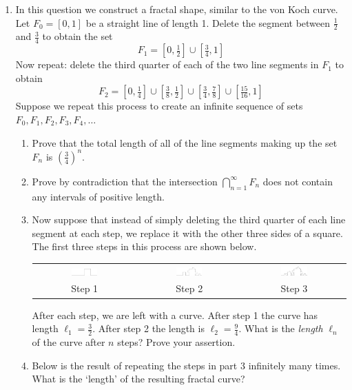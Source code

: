 \begin{exercises}{}{}
\begin{enumerate}
	\item In this question we construct a fractal shape, similar to the von Koch curve. Let $F_0=[0,1]$ be a straight line of length 1. Delete the segment between $\frac 12$ and $\frac 34$ to obtain the set
    \[F_1=[0,\tfrac 12]\cup[\tfrac 34,1]\]
    Now repeat: delete the third quarter of each of the two line segments in $F_1$ to obtain
    \[F_2=[0,\tfrac 14]\cup[\tfrac 38,\tfrac 12]\cup[\tfrac 34,\tfrac 78]\cup[\tfrac{15}{16},1]\]
    Suppose we repeat this process to create an infinite sequence of sets $F_0,F_1,F_2,F_3,F_4,\ldots$
  \begin{enumerate}
    \item Prove that the total length of all of the line segments making up the set $F_n$ is $\left(\frac 34\right)^n$.
    \item Prove by contradiction that the intersection $\bigcap\limits_{n=1}^\infty F_n$ does not contain any intervals of positive length.
    \item Now suppose that instead of simply deleting the third quarter of each line segment at each step, we replace it with the other three sides of a square. The first three steps in this process are shown below.
    \begin{center}
    \begin{tabular}{ccc}
    \includegraphics[width=0.27\textwidth]{fractal1}
    &
    \includegraphics[width=0.27\textwidth]{fractal2}
    &
    \includegraphics[width=0.27\textwidth]{fractal3}
   	\\
   	Step 1&Step 2&Step 3
    \end{tabular}
    \end{center}
    After each step, we are left with a curve. After step 1 the curve has length $\ell_1=\frac 32$. After step 2 the length is $\ell_2=\frac 94$. What is the \emph{length} $\ell_n$ of the curve after $n$ steps? Prove your assertion.
    \item Below is the result of repeating the steps in part 3 infinitely many times. What is the `length' of the resulting fractal curve?

\end{enumerate}
\end{enumerate}
\end{exercises}
